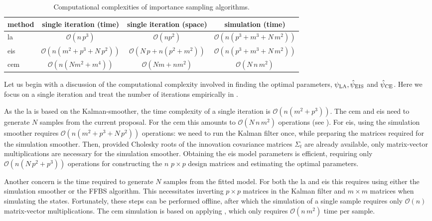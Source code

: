 \begin{table}
    \centering
    \begin{tabular}{lccc}
        \toprule 
        method & single iteration (time) & single iteration (space) & simulation (time)\\
        \midrule
        \gls{la} & $\mathcal O (n \,p^{3})$ & $\mathcal O (np^{2})$ & $\mathcal O(n (p^{3} + m^{3} + N\,m^{2}))$ \\
        \gls{eis} & $\mathcal O (n(m^{2} + p^{3} + N\,p^{2}))$ & $\mathcal O (N\,p + n(p^{2} + m^{2}))$ & $\mathcal O(n (p^{3} + m^{3} + N\,m^{2}))$\\
        \gls{cem} & $\mathcal O (n (Nm^{2} + m^{4}))$& $\mathcal O (Nm + nm^{2})$ & $\mathcal O (N\,n\,m^{2})$\\
        \bottomrule
    \end{tabular}
    \caption{Computational complexities of importance sampling algorithms.}
    \label{tab:comparison-time-space-complexity}
\end{table}

Let us begin with a discussion of the computational complexity involved in finding the optimal parameters, $\psi_{{\text{LA}}}, \hat\psi_{{\text{EIS}}}$ and $\hat\psi_{{\text{CE}}}$. Here we focus on a single iteration and treat the number of iterations empirically in .

As the \gls{la} is based on the Kalman-smoother, the time complexity of a single iteration is $\mathcal O(n(m^{2} + p^{3}))$. The \gls{cem} and \gls{eis} need to generate $N$ samples from the current proposal. For the \gls{cem} this amounts to $\mathcal O(N\,n\, m^{2})$ operations (see ). For \gls{eis}, using the simulation smoother \cite{Durbin2002Simple} requires $\mathcal O (n(m^{2} + p^{3} + N\,p^2))$ operations: we need to run the Kalman filter once, while preparing the matrices required for the simulation smoother. Then, provided Cholesky roots of the innovation covariance matrices $\Sigma_{t}$ are already available, only matrix-vector multiplications are necessary for the simulation smoother. Obtaining the \gls{eis} model parameters is efficient, requiring only $\mathcal O(n(N\,p^2 + p^{3}))$ operations for constructing the $n$ $p\times p$ design matrices and estimating the optimal parameters. 

Another concern is the time required to generate $N$ samples from the fitted model. For both the \gls{la} and \gls{eis} this requires using either the simulation smoother or the FFBS algorithm. This necessitates inverting $p\times p$ matrices in the Kalman filter and $m \times m$ matrices when simulating the states. Fortunately, these steps can be performed offline, after which the simulation of a single sample requires only $\mathcal O(n)$ matrix-vector multiplications. The \gls{cem} simulation is based on applying , which only requires $\mathcal O(n\,m^{2})$ time per sample. 

